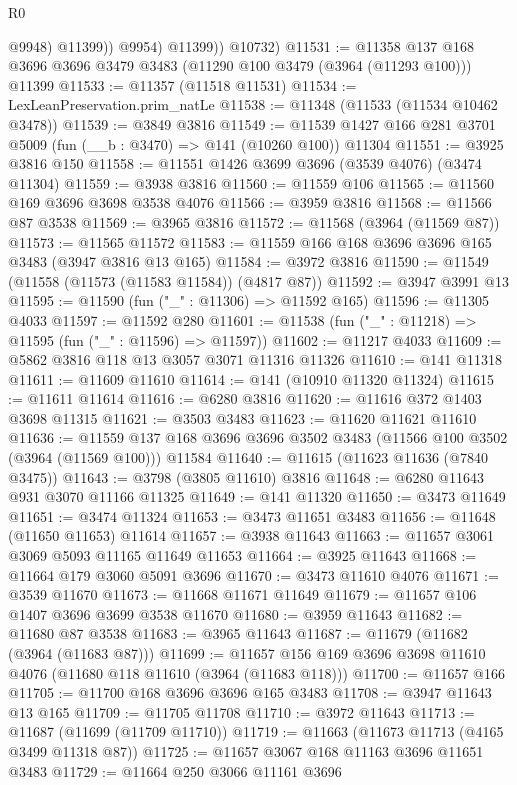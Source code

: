 \begin{lexlean}{R0}
\begin{coremodule}
                  @9948)
                @11399))
            @9954)
          @11399))
      @10732)
@11531 := @11358 @137 @168 @3696 @3696 @3479 @3483 (@11290 @100 @3479 (@3964 (@11293 @100))) @11399
@11533 := @11357 (@11518 @11531)
@11534 := LexLeanPreservation.prim_natLe
@11538 := @11348 (@11533 (@11534 @10462 @3478))
@11539 := @3849 @3816
@11549 := @11539 @1427 @166 @281 @3701 @5009 (fun (__b : @3470) => @141 (@10260 @100)) @11304
@11551 := @3925 @3816 @150
@11558 := @11551 @1426 @3699 @3696 (@3539 @4076) (@3474 @11304)
@11559 := @3938 @3816
@11560 := @11559 @106
@11565 := @11560 @169 @3696 @3698 @3538 @4076
@11566 := @3959 @3816
@11568 := @11566 @87 @3538
@11569 := @3965 @3816
@11572 := @11568 (@3964 (@11569 @87))
@11573 := @11565 @11572
@11583 := @11559 @166 @168 @3696 @3696 @165 @3483 (@3947 @3816 @13 @165)
@11584 := @3972 @3816
@11590 := @11549 (@11558 (@11573 (@11583 @11584)) (@4817 @87))
@11592 := @3947 @3991 @13
@11595 := @11590 (fun ("_" : @11306) => @11592 @165)
@11596 := @11305 @4033
@11597 := @11592 @280
@11601 := @11538 (fun ("_" : @11218) => @11595 (fun ("_" : @11596) => @11597))
@11602 := @11217 @4033
@11609 := @5862 @3816 @118 @13 @3057 @3071 @11316 @11326
@11610 := @141 @11318
@11611 := @11609 @11610
@11614 := @141 (@10910 @11320 @11324)
@11615 := @11611 @11614
@11616 := @6280 @3816
@11620 := @11616 @372 @1403 @3698 @11315
@11621 := @3503 @3483
@11623 := @11620 @11621 @11610
@11636 := @11559 @137 @168 @3696 @3696 @3502 @3483 (@11566 @100 @3502 (@3964 (@11569 @100))) @11584
@11640 := @11615 (@11623 @11636 (@7840 @3475))
@11643 := @3798 (@3805 @11610) @3816
@11648 := @6280 @11643 @931 @3070 @11166 @11325
@11649 := @141 @11320
@11650 := @3473 @11649
@11651 := @3474 @11324
@11653 := @3473 @11651 @3483
@11656 := @11648 (@11650 @11653) @11614
@11657 := @3938 @11643
@11663 := @11657 @3061 @3069 @5093 @11165 @11649 @11653
@11664 := @3925 @11643
@11668 := @11664 @179 @3060 @5091 @3696
@11670 := @3473 @11610 @4076
@11671 := @3539 @11670
@11673 := @11668 @11671 @11649
@11679 := @11657 @106 @1407 @3696 @3699 @3538 @11670
@11680 := @3959 @11643
@11682 := @11680 @87 @3538
@11683 := @3965 @11643
@11687 := @11679 (@11682 (@3964 (@11683 @87)))
@11699 := @11657 @156 @169 @3696 @3698 @11610 @4076 (@11680 @118 @11610 (@3964 (@11683 @118)))
@11700 := @11657 @166
@11705 := @11700 @168 @3696 @3696 @165 @3483
@11708 := @3947 @11643 @13 @165
@11709 := @11705 @11708
@11710 := @3972 @11643
@11713 := @11687 (@11699 (@11709 @11710))
@11719 := @11663 (@11673 @11713 (@4165 @3499 @11318 @87))
@11725 := @11657 @3067 @168 @11163 @3696 @11651 @3483
@11729 := @11664 @250 @3066 @11161 @3696

\end{coremodule}
\end{lexlean}
